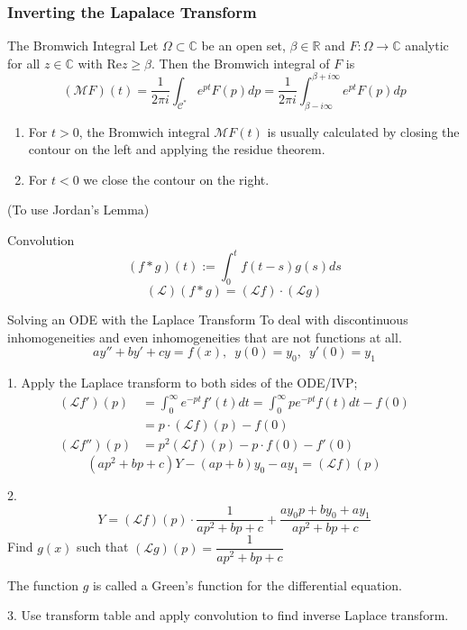 \documentclass{beamer}
\begin{document}
\begin{frame}
\frametitle{Inverting the Lapalace Transform}
\begin{block}{The Bromwich Integral}
Let $\Omega \subset \mathbb{C}$ be an open set, $\beta\in \mathbb{R}$ and $F :\Omega \rightarrow\mathbb{C}$ analytic for all $z \in \mathbb{C}$ with $\text{Re} z \geqslant\beta$. Then the Bromwich integral of $F$ is
$$(\mathscr{M}F)(t) =\dfrac{1}{2\pi i}\int_{\mathcal{C}^*}e^{pt}F(p) dp=\dfrac{1}{2\pi i}\int_{\beta-i\infty}^{\beta+i\infty}e^{pt}F(p) dp$$
\begin{enumerate}
\item For $t > 0$, the Bromwich integral $\mathscr{M}F(t)$ is usually calculated by closing the contour on the left and applying the residue theorem.
\item For $t < 0$ we close the contour on the right.
\end{enumerate}
(To use Jordan's Lemma)
\end{block}
\end{frame}

\begin{frame}

\begin{block}{Convolution}
$$(f * g)(t) :=\int^t_0f (t-s)g(s) ds$$
$$(\mathscr{L})(f*g)=(\mathscr{L}f)\cdot(\mathscr{L} g)$$
\end{block}
\end{frame}

\begin{frame}
\begin{block}{Solving an ODE with the Laplace Transform}
To deal with discontinuous inhomogeneities and even inhomogeneities that are not functions at all.
$$ay''+by'+cy=f(x),\,\,\,y(0)=y_0,\,\,\,y'(0)=y_1$$
\end{block}
\begin{block}{1.}
Apply the Laplace transform to both sides of the ODE/IVP;
\begin{align*}
(\mathscr{L}f')(p)&=\int_0^{\infty}e^{-pt}f'(t)dt=\int_0^{\infty}pe^{-pt}f(t)dt-f(0)\\
&=p\cdot(\mathscr{L}f)(p)-f(0)\\
(\mathscr{L}f'')(p)&=p^2(\mathscr{L}f)(p)-p\cdot f(0)-f'(0)
\end{align*}
$$(ap^2+bp+c)Y-(ap+b)y_0-ay_1=(\mathscr{L}f)(p)$$
\end{block}
\end{frame}

\begin{frame}
\begin{block}{2.}
$$Y=(\mathscr{L}f)(p)\cdot\dfrac{1}{ap^2+bp+c}+\dfrac{ay_0p+by_0+ay_1}{ap^2+bp+c}$$
Find $g(x)$ such that $(\mathscr{L}g)(p)=\dfrac{1}{ap^2+bp+c}$

The function $g$ is called a Green's function for the differential
equation.
\end{block}
\begin{block}{3. }
Use transform table and apply convolution to find inverse Laplace transform.
\end{block}
\end{frame}
\end{document}
